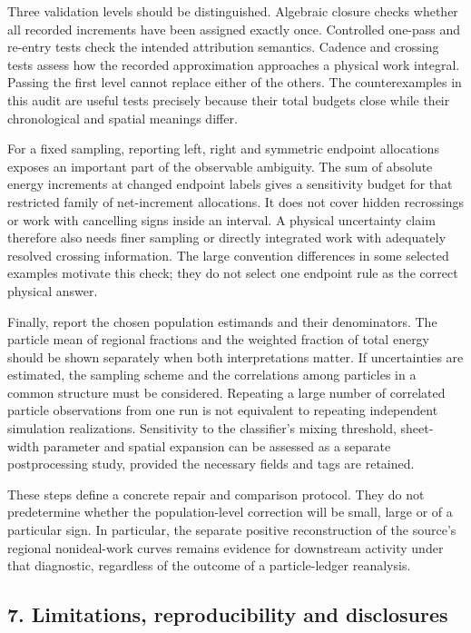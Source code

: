 Three validation levels should be distinguished. Algebraic closure
checks whether all recorded increments have been assigned exactly once.
Controlled one-pass and re-entry tests check the intended attribution
semantics. Cadence and crossing tests assess how the recorded
approximation approaches a physical work integral. Passing the first
level cannot replace either of the others. The counterexamples in this
audit are useful tests precisely because their total budgets close while
their chronological and spatial meanings differ.

For a fixed sampling, reporting left, right and symmetric endpoint
allocations exposes an important part of the observable ambiguity. The
sum of absolute energy increments at changed endpoint labels gives a
sensitivity budget for that restricted family of net-increment
allocations. It does not cover hidden recrossings or work with
cancelling signs inside an interval. A physical uncertainty claim
therefore also needs finer sampling or directly integrated work with
adequately resolved crossing information. The large convention
differences in some selected examples motivate this check; they do not
select one endpoint rule as the correct physical answer.

Finally, report the chosen population estimands and their denominators.
The particle mean of regional fractions and the weighted fraction of
total energy should be shown separately when both interpretations
matter. If uncertainties are estimated, the sampling scheme and the
correlations among particles in a common structure must be considered.
Repeating a large number of correlated particle observations from one
run is not equivalent to repeating independent simulation realizations.
Sensitivity to the classifier's mixing threshold, sheet-width parameter
and spatial expansion can be assessed as a separate postprocessing
study, provided the necessary fields and tags are retained.

These steps define a concrete repair and comparison protocol. They do
not predetermine whether the population-level correction will be small,
large or of a particular sign. In particular, the separate positive
reconstruction of the source's regional nonideal-work curves remains
evidence for downstream activity under that diagnostic, regardless of
the outcome of a particle-ledger reanalysis.

\FloatBarrier
\subsection{7. Limitations, reproducibility and
disclosures}\label{limitations-reproducibility-and-disclosures}

